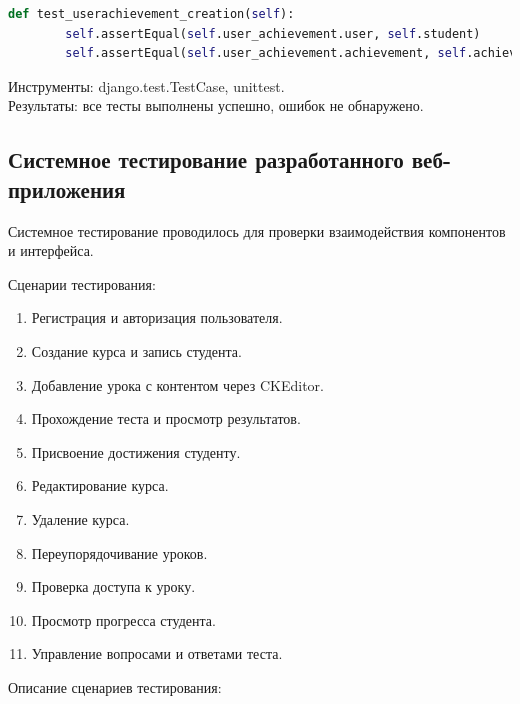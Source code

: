 \begin{enumerate}
\begin{lstlisting}[language=Python, caption=Модульный тест для UserAchievement, label=lst:userachievement_test]
		def test_userachievement_creation(self):
		self.assertEqual(self.user_achievement.user, self.student)
		self.assertEqual(self.user_achievement.achievement, self.achievement)
	\end{lstlisting}
\end{enumerate}

Инструменты: django.test.TestCase, unittest.\\
Результаты: все тесты выполнены успешно, ошибок не обнаружено.


\subsection{Системное тестирование разработанного веб-приложения}

Системное тестирование проводилось для проверки взаимодействия компонентов и интерфейса.

Сценарии тестирования:
	\begin{enumerate}
	\item Регистрация и авторизация пользователя.
	\item Создание курса и запись студента.
	\item Добавление урока с контентом через CKEditor.
	\item Прохождение теста и просмотр результатов.
	\item Присвоение достижения студенту.
	\item Редактирование курса.
	\item Удаление курса.
	\item Переупорядочивание уроков.
	\item Проверка доступа к уроку.
	\item Просмотр прогресса студента.
	\item Управление вопросами и ответами теста.
	\end{enumerate}


Описание сценариев тестирования:

